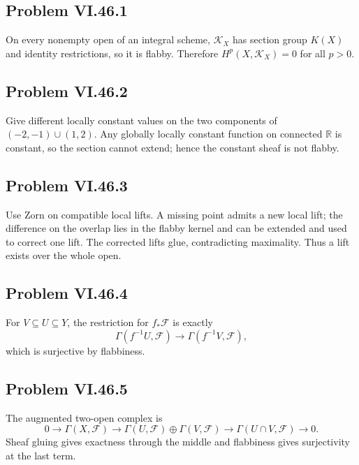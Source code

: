 \subsection*{Problem VI.46.1}
\begin{solution}
On every nonempty open of an integral scheme, \(\mathcal K_X\) has section group \(K(X)\) and identity restrictions, so it is flabby.  Therefore \(H^p(X,\mathcal K_X)=0\) for all \(p>0\).
\end{solution}

\subsection*{Problem VI.46.2}
\begin{solution}
Give different locally constant values on the two components of \((-2,-1)\cup(1,2)\).  Any globally locally constant function on connected \(\mathbb R\) is constant, so the section cannot extend; hence the constant sheaf is not flabby.
\end{solution}

\subsection*{Problem VI.46.3}
\begin{solution}
Use Zorn on compatible local lifts.  A missing point admits a new local lift; the difference on the overlap lies in the flabby kernel and can be extended and used to correct one lift.  The corrected lifts glue, contradicting maximality.  Thus a lift exists over the whole open.
\end{solution}

\subsection*{Problem VI.46.4}
\begin{solution}
For \(V\subseteq U\subseteq Y\), the restriction for \(f_*\mathcal F\) is exactly
\[
\Gamma(f^{-1}U,\mathcal F)\to\Gamma(f^{-1}V,\mathcal F),
\]
which is surjective by flabbiness.
\end{solution}

\subsection*{Problem VI.46.5}
\begin{solution}
The augmented two-open complex is
\[
0\to\Gamma(X,\mathcal F)\to\Gamma(U,\mathcal F)\oplus\Gamma(V,\mathcal F)\to\Gamma(U\cap V,\mathcal F)\to0.
\]
Sheaf gluing gives exactness through the middle and flabbiness gives surjectivity at the last term.
\end{solution}

